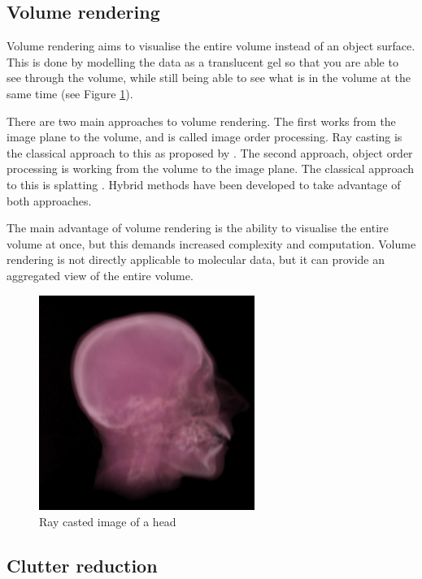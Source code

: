 
\subsection{Volume rendering}
\label{sub:background_volume}

Volume rendering aims to visualise the entire volume instead of an object
surface. This is done by modelling the data as a translucent gel so that you
are able to see through the volume, while still being able to see what is in
the volume at the same time (see Figure \ref{fig:background_head}).

There are two main approaches to volume rendering. The first works from the
image plane to the volume, and is called image order processing. Ray casting is
the classical approach to this as proposed by \citet{levoy88}. The second
approach, object order processing is working from the volume to the image
plane. The classical approach to this is splatting \citep{westover89}. Hybrid
methods have been developed to take advantage of both approaches.

The main advantage of volume rendering is the ability to visualise the entire
volume at once, but this demands increased complexity and computation. Volume
rendering is not directly applicable to molecular data, but it can provide an
aggregated view of the entire volume.

\begin{figure}[h!]
  \begin{center}
    \includegraphics[width=70mm]{head_volume}
  \end{center}
  \caption{Ray casted image of a head}
  \label{fig:background_head}
\end{figure}


\subsection{Clutter reduction}
\label{sub:background_clutter}

